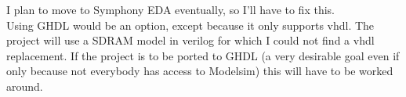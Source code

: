    I plan to move to Symphony EDA eventually, so I'll have to fix this.\\
    
    Using GHDL would be an option, except because it only supports vhdl. The
    project will use a SDRAM model in verilog for which I could not find a
    vhdl replacement. If the project is to be ported to GHDL (a very desirable 
    goal even if only because not everybody has access to Modelsim) this will 
    have to be worked around.\\

